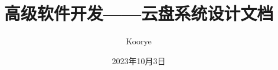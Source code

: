 \documentclass{article}
\title{高级软件开发——云盘系统设计文档}
\author{Koorye}
\date{2023年10月3日}
\begin{document}
\begin{titlepage}
\maketitle
\end{titlepage}

\tableofcontents
\newpage






\end{document}
